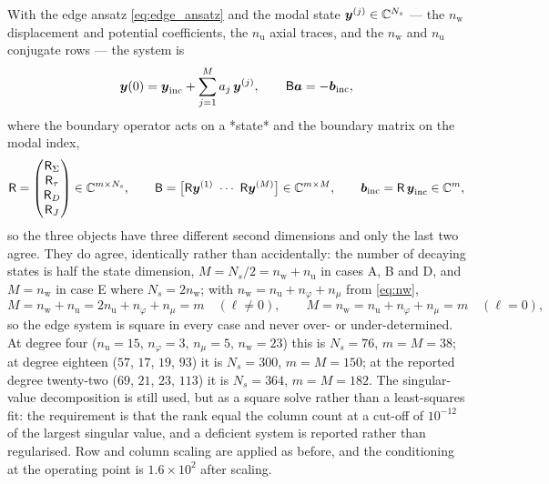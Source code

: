 With the edge ansatz \eqref{eq:edge_ansatz} and the modal state
$\boldsymbol{y}^{(j)}\in\mathbb{C}^{N_s}$ --- the $n_{\mathrm w}$ displacement and
potential coefficients, the $n_{\mathrm u}$ axial traces, and the $n_{\mathrm w}$
and $n_{\mathrm u}$ conjugate rows --- the system is
\begin{equation}
\label{eq:app_edge}
\boldsymbol{y}(0)=\boldsymbol{y}_{\text{inc}}+\sum_{j=1}^{M}a_j\,\boldsymbol{y}^{(j)},
\qquad
\mathsf B\boldsymbol{a}=-\boldsymbol{b}_{\text{inc}},
\end{equation}
where the boundary operator acts on a *state* and the boundary matrix on the
modal index,
\begin{equation}
\label{eq:app_edge_R}
\mathsf R=\begin{pmatrix}
\mathsf R_{\Sigma}\\
\mathsf R_{\tau}\\
\mathsf R_{D}\\
\mathsf R_{J}
\end{pmatrix}\in\mathbb{C}^{m\times N_s},
\qquad
\mathsf B=\bigl[\mathsf R\boldsymbol{y}^{(1)}\ \cdots\ \mathsf R\boldsymbol{y}^{(M)}\bigr]
\in\mathbb{C}^{m\times M},
\qquad
\boldsymbol{b}_{\text{inc}}=\mathsf R\,\boldsymbol{y}_{\text{inc}}\in\mathbb{C}^{m},
\end{equation}
so the three objects have three different second dimensions and only the last two
agree.  They do agree, identically rather than accidentally: the number of
decaying states is half the state dimension, $M=N_s/2=n_{\mathrm w}+n_{\mathrm u}$
in cases A, B and D, and $M=n_{\mathrm w}$ in case E where $N_s=2n_{\mathrm w}$;
with $n_{\mathrm w}=n_{\mathrm u}+n_\varphi+n_\mu$ from \eqref{eq:nw},
\begin{equation}
\label{eq:app_edge_square}
M=n_{\mathrm w}+n_{\mathrm u}=2n_{\mathrm u}+n_\varphi+n_\mu=m
\quad(\ell\neq0),
\qquad
M=n_{\mathrm w}=n_{\mathrm u}+n_\varphi+n_\mu=m
\quad(\ell=0),
\end{equation}
so the edge system is square in every case and never over- or under-determined.
At degree four ($n_{\mathrm u}=15$, $n_\varphi=3$, $n_\mu=5$, $n_{\mathrm w}=23$)
this is $N_s=76$, $m=M=38$; at degree eighteen ($57$, $17$, $19$, $93$) it is
$N_s=300$, $m=M=150$; at the reported degree twenty-two ($69$, $21$, $23$, $113$)
it is $N_s=364$, $m=M=182$.  The singular-value decomposition is still used, but
as a square solve rather than a least-squares fit: the requirement is that the
rank equal the column count at a cut-off of $10^{-12}$ of the largest singular
value, and a deficient system is reported rather than regularised.  Row and
column scaling are applied as before, and the conditioning at the operating point
is $1.6\times10^{2}$ after scaling.
